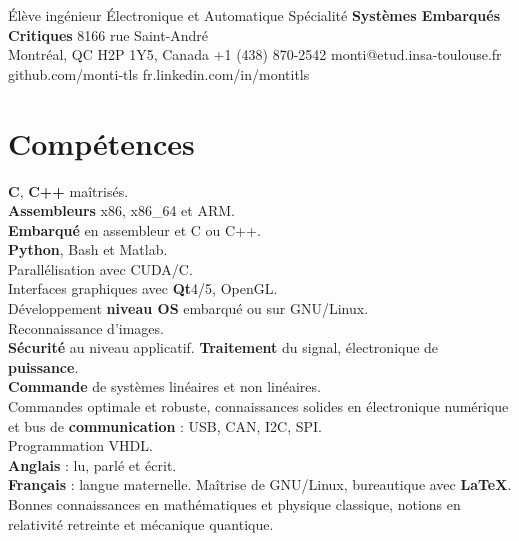 \documentclass{custom_cv}
\begin{document}
           {Élève ingénieur}
           {Électronique et Automatique}
           {Spécialité \textbf{Systèmes Embarqués Critiques}}
           {8166 rue Saint-André\\Montréal, QC H2P 1Y5, Canada}
           {+1 (438) 870-2542}
           {monti@etud.insa-toulouse.fr}
           {github.com/monti-tls}
           {fr.linkedin.com/in/montitls}

\section{Compétences}

\begin{Skills}%
{\textbf{C}, \textbf{C++} maîtrisés.\\
\textbf{Assembleurs} x86, x86\_64 et ARM.\\
\textbf{Embarqué} en assembleur et C ou C++.\\
\textbf{Python}, Bash et Matlab.\\
Parallélisation avec CUDA/C.\\
Interfaces graphiques avec \textbf{Qt}4/5, OpenGL.\\
Développement \textbf{niveau OS} embarqué ou sur GNU/Linux.\\
Reconnaissance d'images.\\
\textbf{Sécurité} au niveau applicatif.}%
{\textbf{Traitement} du signal, électronique de \textbf{puissance}.\\
\textbf{Commande} de systèmes linéaires et non linéaires.\\
Commandes optimale et robuste, connaissances solides en électronique numérique et bus de \textbf{communication} : USB, CAN, I2C, SPI.\\
Programmation VHDL.}\\
{\textbf{Anglais} : lu, parlé et écrit.\\
\textbf{Français} : langue maternelle.}%
{Maîtrise de GNU/Linux, bureautique avec \textbf{\LaTeX}.\\
Bonnes connaissances en mathématiques et physique classique, notions en relativité retreinte et mécanique quantique.}%
\end{Skills}
\end{document}
